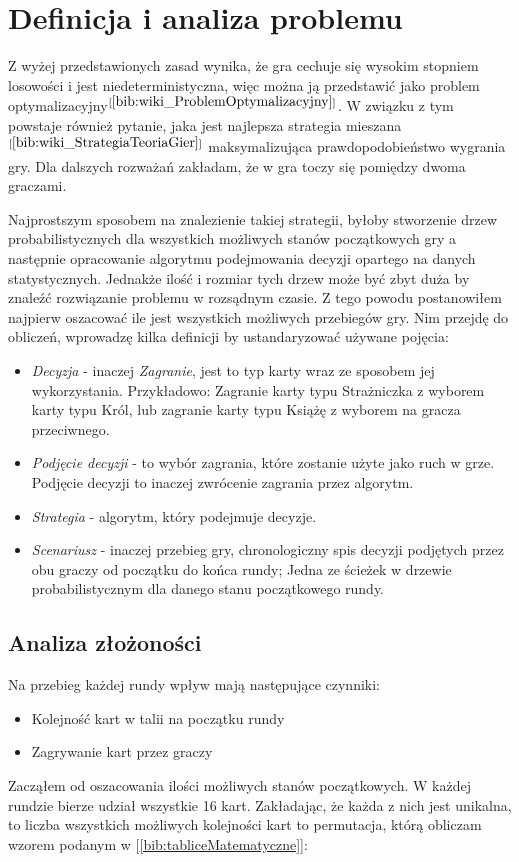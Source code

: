 \section{Definicja i analiza problemu}
\label{sec:opisProblemu}
Z wyżej przedstawionych zasad wynika, że gra cechuje się wysokim stopniem losowości i jest niedeterministyczna, więc można ją przedstawić jako problem optymalizacyjny$^{[\ref{bib:wiki_ProblemOptymalizacyjny}]}$. W związku z tym powstaje również pytanie, jaka jest najlepsza strategia mieszana$^{[\ref{bib:wiki_StrategiaTeoriaGier}]}$ maksymalizująca prawdopodobieństwo wygrania gry. Dla dalszych rozważań zakładam, że w gra toczy się pomiędzy dwoma graczami.

Najprostszym sposobem na znalezienie takiej strategii, byłoby stworzenie drzew probabilistycznych dla wszystkich możliwych stanów początkowych gry a następnie opracowanie algorytmu podejmowania decyzji opartego na danych statystycznych. Jednakże ilość i rozmiar tych drzew może być zbyt duża by znaleźć rozwiązanie problemu w rozsądnym czasie. Z tego powodu postanowiłem najpierw oszacować ile jest wszystkich możliwych przebiegów gry. Nim przejdę do obliczeń, wprowadzę kilka definicji by ustandaryzować używane pojęcia:
\begin{itemize}
	\item \textit{Decyzja} - inaczej \textit{Zagranie}, jest to typ karty wraz ze sposobem jej wykorzystania. Przykładowo: Zagranie karty typu Strażniczka z wyborem karty typu Król, lub zagranie karty typu Książę z wyborem na gracza przeciwnego.
	\item \textit{Podjęcie decyzji} - to wybór zagrania, które zostanie użyte jako ruch w grze. Podjęcie decyzji to inaczej zwrócenie zagrania przez algorytm.
	\item \textit{Strategia} - algorytm, który podejmuje decyzje. 
	\item \textit{Scenariusz} - inaczej przebieg gry, chronologiczny spis decyzji podjętych przez obu graczy od początku do końca rundy; Jedna ze ścieżek w drzewie probabilistycznym dla danego stanu początkowego rundy.
\end{itemize}

\subsection*{Analiza złożoności}
Na przebieg każdej rundy wpływ mają następujące czynniki:
\begin{itemize}
	\item Kolejność kart w talii na początku rundy
	\item Zagrywanie kart przez graczy
\end{itemize}
Zacząłem od oszacowania ilości możliwych stanów początkowych. W każdej rundzie bierze udział wszystkie 16 kart. Zakładając, że każda z nich jest unikalna, to  liczba wszystkich możliwych kolejności kart to permutacja, którą obliczam wzorem podanym w [\ref{bib:tabliceMatematyczne}]:


